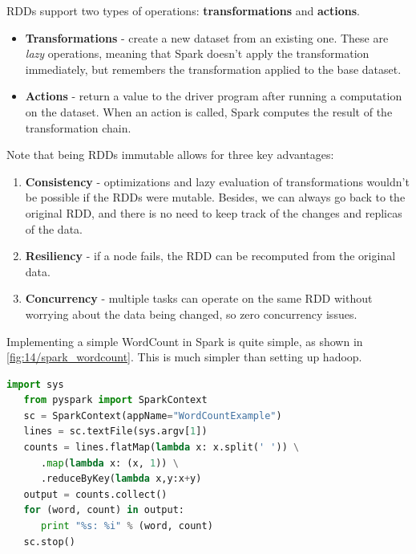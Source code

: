 {RDDs support two types of operations: \textbf{transformations} and \textbf{actions}.\ns
\begin{itemize}
   \item \textbf{Transformations} - create a new dataset from an existing one. These are \textit{lazy} operations, meaning that Spark doesn't apply the transformation immediately, but remembers the transformation applied to the base dataset.
   \item \textbf{Actions} - return a value to the driver program after running a computation on the dataset.
   When an action is called, Spark computes the result of the transformation chain.
\end{itemize}}

Note that being RDDs immutable allows for three key advantages:
\begin{enumerate}
   \item \textbf{Consistency} - optimizations and lazy evaluation of transformations wouldn't be possible if the RDDs were mutable. 
   Besides, we can always go back to the original RDD, and there is no need to keep track of the changes and replicas of the data.
   \item \textbf{Resiliency} - if a node fails, the RDD can be recomputed from the original data.
   \item \textbf{Concurrency} - multiple tasks can operate on the same RDD without worrying about the data being changed, so zero concurrency issues.
\end{enumerate}


Implementing a simple WordCount in Spark is quite simple, as shown in \autoref{fig:14/spark_wordcount}.
This is much simpler than setting up hadoop.
\begin{lstlisting}[language=Python, caption={Spark WordCount example}]
   import sys
   from pyspark import SparkContext
   sc = SparkContext(appName="WordCountExample")
   lines = sc.textFile(sys.argv[1])
   counts = lines.flatMap(lambda x: x.split(' ')) \
      .map(lambda x: (x, 1)) \
      .reduceByKey(lambda x,y:x+y)
   output = counts.collect()
   for (word, count) in output:
      print "%s: %i" % (word, count)
   sc.stop()
\end{lstlisting}

